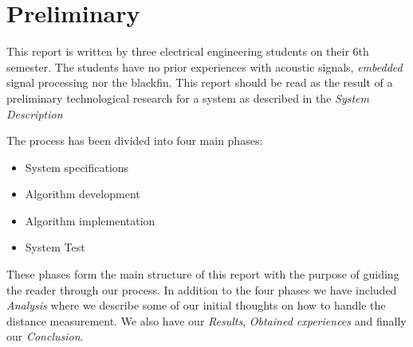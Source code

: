 \chapter{Preliminary}
This report is written by three electrical engineering students on their 6th semester. The students have no prior experiences with acoustic signals, \textit{embedded} signal processing nor the blackfin. This report should be read as the result of a preliminary technological research for a system as described in the \textit{System Description}

The process has been divided into four main phases:
\begin{itemize}
\item System specifications
\item Algorithm development
\item Algorithm implementation
\item System Test
\end{itemize}

These phases form the main structure of this report with the purpose of guiding the reader through our process. In addition to the four phases we have included \textit{Analysis} where we describe some of our initial thoughts on how to handle the distance measurement. We also have our \textit{Results}, \textit{Obtained experiences} and finally our \textit{Conclusion}.
